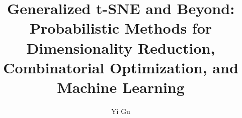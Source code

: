\documentclass[12pt]{nuthesis}
\author{Yi Gu}
\title{Generalized t-SNE and Beyond: Probabilistic Methods for Dimensionality Reduction, Combinatorial Optimization, and Machine Learning}
\begin{document}
%
\frontmatter
\maketitle
\copyrightpage



\clearpage{} 
\tableofcontents
\clearpage{} 
\listoftables	
\clearpage{} 
\listoffigures	
%
\mainmatter




%
\begin{singlespace}
	\clearpage{}
	 \nocite{*} 
\end{singlespace}
%
\end{document}
